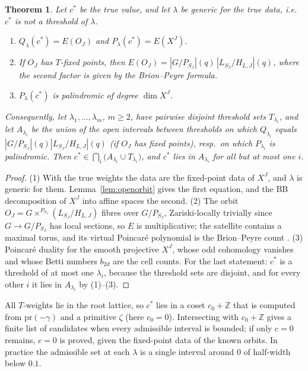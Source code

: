 \documentclass[11pt]{amsart}
\newtheorem{theorem}{Theorem}[section]
\theoremstyle{definition}
\theoremstyle{remark}
\newcommand{\ZZ}{\mathbb{Z}}
\newcommand{\pr}{\mathrm{pr}}
\begin{document}
\begin{theorem}\label{thm:certificate}
Let $c^*$ be the true value, and let $\lambda$ be generic for the true data,
i.e.\ $c^*$ is not a threshold of $\lambda$.
\begin{enumerate}
\item $Q_\lambda(c^*) = E(O_J)$ and $P_\lambda(c^*) = E(X^J)$.
\item If $O_J$ has $T$-fixed points, then
$E(O_J) = |G/P_{S_J}|(q)\,|L_{S_J}/H_{L,J}|(q)$, where the second factor is
given by the Brion--Peyre formula.
\item $P_\lambda(c^*)$ is palindromic of degree $\dim X^J$.
\end{enumerate}
Consequently, let $\lambda_1,\dots,\lambda_m$, $m\ge 2$, have pairwise disjoint
threshold sets $T_{\lambda_i}$, and let $A_{\lambda_i}$ be the union of the open
intervals between thresholds on which $Q_{\lambda_i}$ equals
$|G/P_{S_J}|(q)|L_{S_J}/H_{L,J}|(q)$ (if $O_J$ has fixed points), resp.\ on
which $P_{\lambda_i}$ is palindromic. Then
$c^*\in\bigcap_i\bigl(A_{\lambda_i}\cup T_{\lambda_i}\bigr)$, and $c^*$ lies
in $A_{\lambda_i}$ for all but at most one $i$.
\end{theorem}
\begin{proof}
(1) With the true weights the data are the fixed-point data of $X^J$, and
$\lambda$ is generic for them. Lemma~\ref{lem:openorbit} gives the first
equation, and the BB decomposition of $X^J$ into affine spaces the second.
(2) The orbit $O_J=G\times^{P_{S_J}}(L_{S_J}/H_{L,J})$ fibres over $G/P_{S_J}$,
Zariski-locally trivially since $G\to G/P_{S_J}$ has local sections, so $E$
is multiplicative; the satellite contains a maximal torus, and its
virtual Poincar\'e polynomial is the Brion--Peyre count \cite{BrionPeyre}.
(3) Poincar\'e duality for the smooth projective $X^J$, whose odd
cohomology vanishes and whose Betti numbers $b_{2d}$ are the cell counts.
For the last statement: $c^*$ is a threshold of at most one $\lambda_i$,
because the threshold sets are disjoint, and for every other $i$ it lies in
$A_{\lambda_i}$ by (1)--(3).
\end{proof}

All $T$-weights lie in the root lattice, so $c^*$ lies in a coset
$c_0+\ZZ$ that is computed from $\pr(-\gamma)$ and a primitive $\zeta$
(here $c_0=0$). Intersecting with $c_0+\ZZ$ gives a finite list of
candidates when every admissible interval is bounded; if only $c=0$
remains, $c=0$ is proved, given the fixed-point data of the known orbits.
In practice the admissible set at each $\lambda$ is a single interval
around $0$ of half-width below $0.1$.
\end{document}
